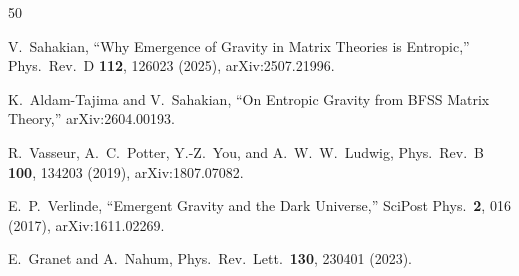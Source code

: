 \documentclass[aps,prd,twocolumn,superscriptaddress,nofootinbib,floatfix]{revtex4-2}
\begin{document}
\begin{thebibliography}{50}

V.~Sahakian, ``Why Emergence of Gravity in Matrix Theories is Entropic,'' Phys.\ Rev.\ D \textbf{112}, 126023 (2025), arXiv:2507.21996.

K.~Aldam-Tajima and V.~Sahakian, ``On Entropic Gravity from BFSS Matrix Theory,'' arXiv:2604.00193.

R.~Vasseur, A.~C.~Potter, Y.-Z.~You, and A.~W.~W.~Ludwig, Phys.\ Rev.\ B \textbf{100}, 134203 (2019), arXiv:1807.07082.

E.~P.~Verlinde, ``Emergent Gravity and the Dark Universe,'' SciPost Phys.\ \textbf{2}, 016 (2017), arXiv:1611.02269.

E.~Granet and A.~Nahum, Phys.\ Rev.\ Lett.\ \textbf{130}, 230401 (2023).

\end{thebibliography}
\end{document}
